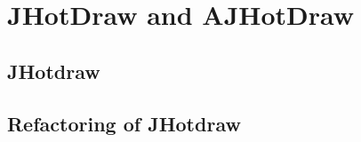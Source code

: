 \section{JHotDraw and AJHotDraw}\label{JHotDraw and AJHotDraw}

\subsection{JHotdraw}\label{JHotdraw}

\subsection{Refactoring of JHotdraw}\label{Refactoring of JHotdraw}